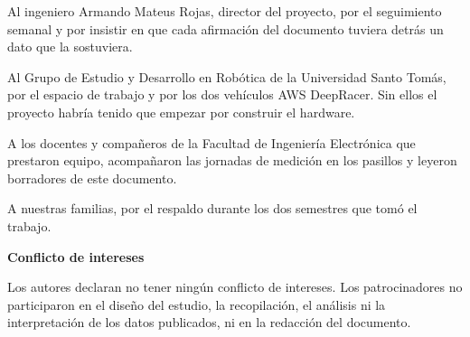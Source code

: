 %
%
%



Al ingeniero Armando Mateus Rojas, director del proyecto, por el seguimiento
semanal y por insistir en que cada afirmación del documento tuviera detrás un
dato que la sostuviera.

Al Grupo de Estudio y Desarrollo en Robótica de la Universidad Santo Tomás, por
el espacio de trabajo y por los dos vehículos AWS DeepRacer. Sin ellos el
proyecto habría tenido que empezar por construir el hardware.

A los docentes y compañeros de la Facultad de Ingeniería Electrónica que
prestaron equipo, acompañaron las jornadas de medición en los pasillos y leyeron
borradores de este documento.

A nuestras familias, por el respaldo durante los dos semestres que tomó el
trabajo.

\vspace{1.5em}
\textbf{Conflicto de intereses}

Los autores declaran no tener ningún conflicto de intereses. Los patrocinadores
no participaron en el diseño del estudio, la recopilación, el análisis ni la
interpretación de los datos publicados, ni en la redacción del documento.

